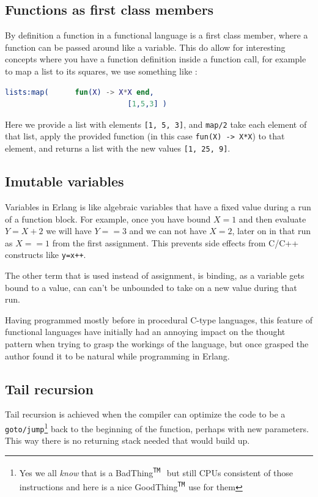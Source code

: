\documentclass[a4paper,11pt]{report}
\newcommand{\trademark}{\textsuperscript{\texttt{TM}\ }}
\newcommand{\Bad}{BadThing\trademark}
\newcommand{\Good}{GoodThing\trademark}
\begin{document}
\subsection{Functions as first class members}
\label{sec:func1st}
By definition a function in a functional language is a first class
member, where a function can be passed around like a variable. This do
allow for interesting concepts where you have a function definition
inside a function call, for example to map a list to its squares, we
use something like :
\begin{lstlisting}[language=erlang]
lists:map(		fun(X) -> X*X end,
							[1,5,3] )
\end{lstlisting}

Here we provide a list with elements \texttt{[1, 5, 3]}, and
\texttt{map/2} take each element of that list, apply the provided
function (in this case \texttt{fun(X) -> X*X}) to that element, and
returns a list with the new values \texttt{[1, 25, 9]}.

\subsection{Imutable variables}
\label{sec:imVar}
Variables in Erlang is like algebraic variables that have a fixed
value during a run of a function block. For example, once you have
bound $X=1$ and then evaluate $Y=X+2$ we will have $Y==3$ and we can
not have $X=2$,
later on in that run as $X==1$ from the first assignment. This
prevents side effects from C/C++ constructs like \texttt{y=x++}.

The other term that is used instead of assignment, is binding, as a
variable gets bound to a value, can can't be unbounded to take on a
new value during that run.


Having programmed mostly before in procedural C-type languages, this
feature of functional languages have initially had an annoying impact on
the thought pattern when trying to grasp the workings of the language,
but once grasped the author found it to be natural while programming
in Erlang.


\subsection{Tail recursion}
\label{sec:tailrec}
Tail recursion is achieved when the compiler can optimize the code to
be a \texttt{goto/jump}\footnote{Yes we all \emph{know} that is a \Bad
  but still CPUs consistent of those instructions and here is a nice
  \Good use for them} back to the beginning of the function, perhaps
with new parameters. This way there is no returning stack needed that
would build up.
\end{document}
